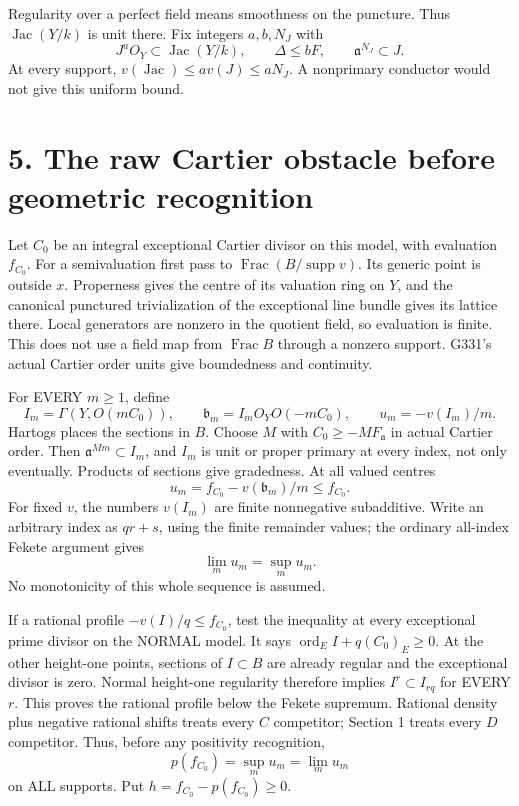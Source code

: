 \documentclass[11pt]{article}
\begin{document}
Regularity over a perfect field means smoothness on the puncture. Thus \(\operatorname{Jac}(Y/k)\) is unit there. Fix integers \(a,b,N_J\) with
\[
J^aO_Y\subset\operatorname{Jac}(Y/k),\qquad
\Delta\le bF,\qquad \mathfrak a^{N_J}\subset J.
\]
At every support, \(v(\operatorname{Jac})\le a v(J)\le aN_J\). A nonprimary conductor would not give this uniform bound.

\section{5. The raw Cartier obstacle before geometric recognition}

Let \(C_0\) be an integral exceptional Cartier divisor on this model, with evaluation \(f_{C_0}\). For a semivaluation first pass to \(\operatorname{Frac}(B/\operatorname{supp}v)\). Its generic point is outside \(x\). Properness gives the centre of its valuation ring on \(Y\), and the canonical punctured trivialization of the exceptional line bundle gives its lattice there. Local generators are nonzero in the quotient field, so evaluation is finite. This does not use a field map from \(\operatorname{Frac}B\) through a nonzero support. G331's actual Cartier order units give boundedness and continuity.

For EVERY \(m\ge1\), define
\[
I_m=\Gamma(Y,O(mC_0)),\qquad
\mathfrak b_m=I_mO_Y O(-mC_0),\qquad
u_m=-v(I_m)/m.
\]
Hartogs places the sections in \(B\). Choose \(M\) with \(C_0\ge-MF_{\mathfrak a}\) in actual Cartier order. Then \(\mathfrak a^{Mm}\subset I_m\), and \(I_m\) is unit or proper primary at every index, not only eventually. Products of sections give gradedness. At all valued centres
\[
u_m=f_{C_0}-v(\mathfrak b_m)/m\le f_{C_0}.
\]
For fixed \(v\), the numbers \(v(I_m)\) are finite nonnegative subadditive. Write an arbitrary index as \(qr+s\), using the finite remainder values; the ordinary all-index Fekete argument gives
\[
\lim_m u_m=\sup_m u_m.
\]
No monotonicity of this whole sequence is assumed.

If a rational profile \(-v(I)/q\le f_{C_0}\), test the inequality at every exceptional prime divisor on the NORMAL model. It says \(\operatorname{ord}_E I+q(C_0)_E\ge0\). At the other height-one points, sections of \(I\subset B\) are already regular and the exceptional divisor is zero. Normal height-one regularity therefore implies \(I^r\subset I_{rq}\) for EVERY \(r\). This proves the rational profile below the Fekete supremum. Rational density plus negative rational shifts treats every \(C\) competitor; Section 1 treats every \(D\) competitor. Thus, before any positivity recognition,
\[
p(f_{C_0})=\sup_m u_m=\lim_m u_m
\]
on ALL supports. Put \(h=f_{C_0}-p(f_{C_0})\ge0\).
\end{document}
